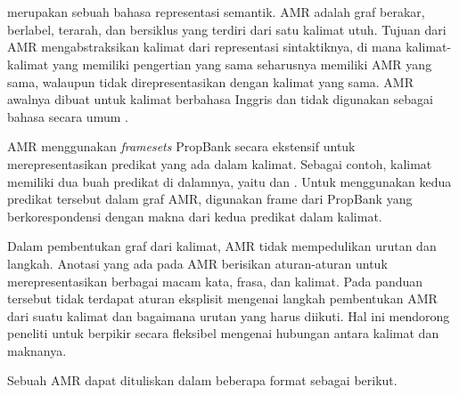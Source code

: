 \section{}

 merupakan sebuah bahasa representasi semantik.
\gls{AMR} adalah graf berakar, berlabel, terarah, dan bersiklus yang terdiri dari satu kalimat utuh.
Tujuan dari \gls{AMR} mengabstraksikan kalimat dari representasi sintaktiknya, di mana kalimat-kalimat yang memiliki pengertian yang sama seharusnya memiliki \gls{AMR} yang sama, walaupun tidak direpresentasikan dengan kalimat yang sama.
\gls{AMR} awalnya dibuat untuk kalimat berbahasa Inggris dan tidak digunakan sebagai bahasa secara umum .

\gls{AMR} menggunakan \textit{framesets} PropBank  secara ekstensif untuk merepresentasikan predikat yang ada dalam kalimat.
Sebagai contoh, kalimat  memiliki dua buah predikat di dalamnya, yaitu  dan .
Untuk menggunakan kedua predikat tersebut dalam graf \gls{AMR}, digunakan frame dari PropBank yang berkorespondensi dengan makna dari kedua predikat dalam kalimat.

Dalam pembentukan graf dari kalimat, \gls{AMR} tidak mempedulikan urutan dan langkah.
Anotasi yang ada pada \gls{AMR} berisikan aturan-aturan untuk merepresentasikan berbagai macam kata, frasa, dan kalimat.
Pada panduan tersebut tidak terdapat aturan eksplisit mengenai langkah pembentukan \gls{AMR} dari suatu kalimat dan bagaimana urutan yang harus diikuti.
Hal ini mendorong peneliti untuk berpikir secara fleksibel mengenai hubungan antara kalimat dan maknanya.

Sebuah \gls{AMR} dapat dituliskan dalam beberapa format sebagai berikut.

